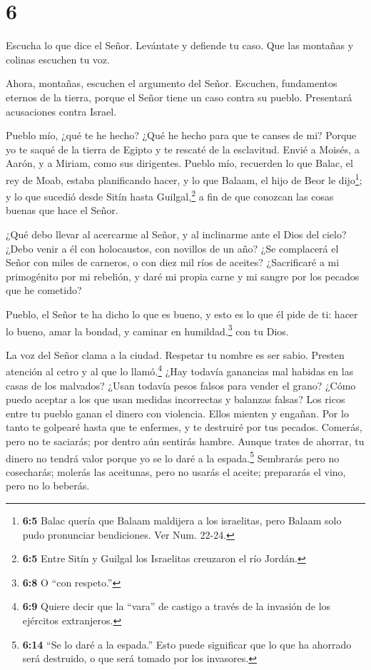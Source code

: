 \hypertarget{section-5}{%
\section{6}\label{section-5}}

 Escucha lo que dice el Señor. Levántate y defiende tu caso.
Que las montañas y colinas escuchen tu voz.

 Ahora, montañas, escuchen el argumento del Señor. Escuchen,
fundamentos eternos de la tierra, porque el Señor tiene un caso contra
su pueblo. Presentará acusaciones contra Israel.

 Pueblo mío, ¿qué te he hecho? ¿Qué he hecho para que te
canses de mi?  Porque yo te saqué de la tierra de Egipto y
te rescaté de la esclavitud. Envié a Moisés, a Aarón, y a Miriam, como
sus dirigentes.  Pueblo mío, recuerden lo que Balac, el rey
de Moab, estaba planificando hacer, y lo que Balaam, el hijo de Beor le
dijo\footnote{\textbf{6:5} Balac quería que Balaam maldijera a los
  israelitas, pero Balaam solo pudo pronunciar bendiciones. Ver Num.
  22-24.}; y lo que sucedió desde Sitín hasta Guilgal,\footnote{\textbf{6:5}
  Entre Sitín y Guilgal los Israelitas creuzaron el río Jordán.} a fin
de que conozcan las cosas buenas que hace el Señor.

 ¿Qué debo llevar al acercarme al Señor, y al inclinarme
ante el Dios del cielo? ¿Debo venir a él con holocaustos, con novillos
de un año?  ¿Se complacerá el Señor con miles de carneros, o
con diez mil ríos de aceites? ¿Sacrificaré a mi primogénito por mi
rebelión, y daré mi propia carne y mi sangre por los pecados que he
cometido?

 Pueblo, el Señor te ha dicho lo que es bueno, y esto es lo
que él pide de ti: hacer lo bueno, amar la bondad, y caminar en
humildad.\footnote{\textbf{6:8} O ``con respeto.''} con tu Dios.

 La voz del Señor clama a la ciudad. Respetar tu nombre es
ser sabio. Presten atención al cetro y al que lo llamó.\footnote{\textbf{6:9}
  Quiere decir que la ``vara'' de castigo a través de la invasión de los
  ejércitos extranjeros.}  ¿Hay todavía ganancias mal
habidas en las casas de los malvados? ¿Usan todavía pesos falsos para
vender el grano?  ¿Cómo puedo aceptar a los que usan
medidas incorrectas y balanzas falsas?  Los ricos entre tu
pueblo ganan el dinero con violencia. Ellos mienten y engañan.
 Por lo tanto te golpearé hasta que te enfermes, y te
destruiré por tus pecados.  Comerás, pero no te saciarás;
por dentro aún sentirás hambre. Aunque trates de ahorrar, tu dinero no
tendrá valor porque yo se lo daré a la espada.\footnote{\textbf{6:14}
  ``Se lo daré a la espada.'' Esto puede significar que lo que ha
  ahorrado será destruido, o que será tomado por los invasores.}
 Sembrarás pero no cosecharás; molerás las aceitunas, pero
no usarás el aceite; prepararás el vino, pero no lo beberás.

